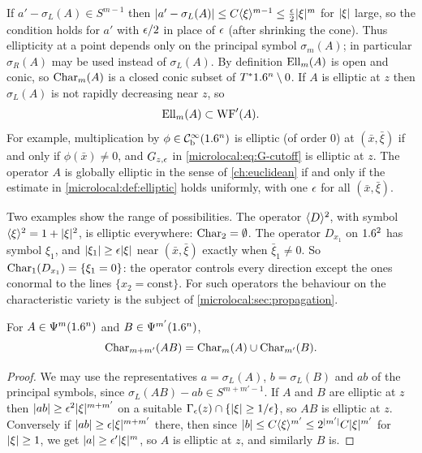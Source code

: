 If $a'-\sigma_L(A)\in S^{m-1}$ then $\lvert a'-\sigma_L(A)\rvert\le
C\langle \xi\rangle^{m-1}\le\frac{\epsilon}2\lvert \xi\rvert^m$ for $\lvert \xi\rvert$ large, so the condition
holds for $a'$ with $\epsilon/2$ in place of $\epsilon$ (after shrinking the cone).
Thus ellipticity at a point depends only on the principal symbol
$\sigma_m(A)$; in particular $\sigma_R(A)$ may be used instead of
$\sigma_L(A)$. By definition $\operatorname{Ell}_m(A)$ is open and conic, so $\operatorname{Char}_m(A)$ is a
closed conic subset of $T^*1.6^n\setminus0$. If $A$ is elliptic at $z$ then
$\sigma_L(A)$ is not rapidly decreasing near $z$, so
\begin{equation*}
  \operatorname{Ell}_m(A)\subset\operatorname{WF}'(A).
\end{equation*}
For example, multiplication by $\phi\in\mathcal{C}^\infty_{\mathrm{b}}(1.6^n)$ is elliptic (of order
$0$) at $(\bar x,\bar\xi)$ if and only if $\phi(\bar x)\ne0$, and
$G_{z,\epsilon}$ in \eqref{microlocal:eq:G-cutoff} is elliptic at $z$. The
operator $A$ is globally elliptic in the sense of \cref{ch:euclidean} if
and only if the estimate in \cref{microlocal:def:elliptic} holds uniformly,
with one $\epsilon$ for all $(\bar x,\bar\xi)$.

\begin{discussion}
  Two examples show the range of possibilities. The operator $\langle D\rangle^2$, with symbol
  $\langle \xi\rangle^2=1+\lvert \xi\rvert^2$, is elliptic everywhere: $\operatorname{Char}_2=\emptyset$. The
  operator $D_{x_1}$ on $1.6^2$ has symbol $\xi_1$, and
  $\lvert \xi_1\rvert\ge\epsilon\lvert \xi\rvert$ near $(\bar x,\bar\xi)$ exactly when
  $\bar\xi_1\ne0$. So $\operatorname{Char}_1(D_{x_1})=\{\xi_1=0\}$: the operator controls
  every direction except the ones conormal to the lines $\{x_2=\text{const}\}$.
  For such operators the behaviour on the characteristic variety is the subject
  of \cref{microlocal:sec:propagation}.
\end{discussion}

\begin{proposition}\label{microlocal:prop:char-product}
  For $A\in\Psi^{m}(1.6^n)$ and $B\in\Psi^{m'}(1.6^n)$,
  \begin{equation*}
    \operatorname{Char}_{m+m'}(AB)=\operatorname{Char}_m(A)\cup\operatorname{Char}_{m'}(B).
  \end{equation*}
\end{proposition}
\begin{proof}
  We may use the representatives $a=\sigma_L(A)$, $b=\sigma_L(B)$ and $ab$ of
  the principal symbols, since $\sigma_L(AB)-ab\in S^{m+m'-1}$. If $A$ and
  $B$ are elliptic at $z$ then $\lvert ab\rvert\ge\epsilon^2\lvert \xi\rvert^{m+m'}$ on a suitable
  $\Gamma_\epsilon(z)\cap\{\lvert \xi\rvert\ge1/\epsilon\}$, so $AB$ is elliptic at $z$.
  Conversely if $\lvert ab\rvert\ge\epsilon\lvert \xi\rvert^{m+m'}$ there, then since
  $\lvert b\rvert\le C\langle \xi\rangle^{m'}\le 2^{\lvert m'\rvert}C\lvert \xi\rvert^{m'}$ for $\lvert \xi\rvert\ge1$,
  we get $\lvert a\rvert\ge\epsilon'\lvert \xi\rvert^m$, so $A$ is elliptic at $z$, and similarly
  $B$ is.
\end{proof}

